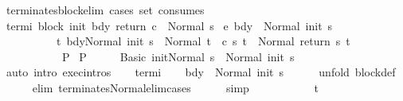 \begin{isabellebody}
\isamarkupfalse%
%
\endisatagproof
{\isafoldproof}%
%
\isadelimproof
\isanewline
%
\endisadelimproof
\isanewline
{}\isamarkupfalse%
\ terminates{\isacharunderscore}block{\isacharunderscore}elim\ {\isacharbrackleft}cases\ set{\isacharcomma}\ consumes\ {}{\isacharbrackright}{\isacharcolon}\isanewline
{}\ termi{\isacharcolon}\ {\isachardoublequoteopen}{\isasymGamma}{\isasymturnstile}block\ init\ bdy\ return\ c\ {\isasymdown}\ Normal\ s{\isachardoublequoteclose}\isanewline
{}\ e{\isacharcolon}\ {\isachardoublequoteopen}{\isasymlbrakk}{\isasymGamma}{\isasymturnstile}bdy\ {\isasymdown}\ Normal\ {\isacharparenleft}init\ s{\isacharparenright}{\isacharsemicolon}\isanewline
\ \ \ \ \ \ \ \ \ \ {\isasymforall}t{\isachardot}\ {\isasymGamma}{\isasymturnstile}{\isasymlangle}bdy{\isacharcomma}Normal\ {\isacharparenleft}init\ s{\isacharparenright}{\isasymrangle}\ {\isasymRightarrow}\ Normal\ t\ {\isasymlongrightarrow}\ {\isasymGamma}{\isasymturnstile}c\ s\ t\ {\isasymdown}\ Normal\ {\isacharparenleft}return\ s\ t{\isacharparenright}\isanewline
\ \ \ \ \ \ \ \ \ {\isasymrbrakk}\ {\isasymLongrightarrow}\ P{\isachardoublequoteclose}\isanewline
{}\ P\isanewline
%
\isadelimproof
%
\endisadelimproof
%
\isatagproof
{}\isamarkupfalse%
\ {\isacharminus}\isanewline
\ \ \isamarkupfalse%
\ {\isachardoublequoteopen}{\isasymGamma}{\isasymturnstile}{\isasymlangle}Basic\ init{\isacharcomma}Normal\ s{\isasymrangle}\ {\isasymRightarrow}\ Normal\ {\isacharparenleft}init\ s{\isacharparenright}{\isachardoublequoteclose}\isanewline
\ \ \ \ \isamarkupfalse%
\ {\isacharparenleft}auto\ intro{\isacharcolon}\ exec{\isachardot}intros{\isacharparenright}\isanewline
\ \ \isamarkupfalse%
\ termi\isanewline
\ \ \isamarkupfalse%
\ {\isachardoublequoteopen}{\isasymGamma}{\isasymturnstile}bdy\ {\isasymdown}\ Normal\ {\isacharparenleft}init\ s{\isacharparenright}{\isachardoublequoteclose}\isanewline
\ \ \ \ \isamarkupfalse%
\ {\isacharparenleft}unfold\ block{\isacharunderscore}def{\isacharparenright}\isanewline
\ \ \ \ \isamarkupfalse%
\ {\isacharparenleft}elim\ terminates{\isacharunderscore}Normal{\isacharunderscore}elim{\isacharunderscore}cases{\isacharparenright}\isanewline
\ \ \ \ \isamarkupfalse%
\ simp\isanewline
\ \ \isamarkupfalse%
\isanewline
\ \ \isacommand{{\isacharbraceleft}}\isamarkupfalse%
\isanewline
\ \ \ \ \isamarkupfalse%
\ t\isanewline

\end{isabellebody}
